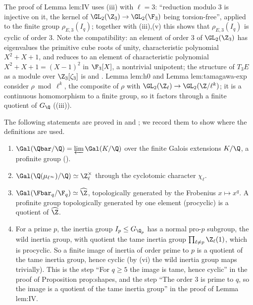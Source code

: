 \begin{paperlink}
The proof of Lemma lem:IV uses (iii) with $\ell=3$: ``reduction modulo $3$ is injective on it, the kernel of $\GL_2(\Z_3)\to\GL_2(\F_3)$ being
torsion-free'', applied to the finite group $\rho_{E,3}(I_q)$; together with (iii),(v) this shows that $\rho_{E,3}(I_q)$ is cyclic of order $3$.
Note the compatibility: an element of order $3$ of $\GL_2(\Z_3)$ has eigenvalues the primitive cube roots of unity, characteristic polynomial $X^2+X+1$, and reduces to
an element of characteristic polynomial $X^2+X+1=(X-1)^2$ in $\F_3[X]$, a nontrivial unipotent; the structure of $T_3E$ as a module over $\Z_3[\zeta_3]$ is
 and . Lemma lem:h0 and Lemma lem:tamagawa-exp consider $\rho\bmod\ell^k$, the composite of $\rho$ with $\GL_2(\Z_\ell)\to\GL_2(\Z/\ell^k)$; it is
a continuous homomorphism to a finite group, so it factors through a finite quotient of $G_\Q$ ((iii)).
\end{paperlink}

\begin{example}\label{ex:groups:galoisprofinite}
The following statements are proved in  and ; we record them to show where the definitions are used.
\begin{enumerate}[label=(\alph*)]
\item $\Gal(\Qbar/\Q)=\varprojlim\Gal(K/\Q)$ over the finite Galois extensions $K/\Q$, a profinite group ().
\item $\Gal(\Q(\mu_{\ell^\infty})/\Q)\simeq\Z_\ell^\times$ through the cyclotomic character $\chi_\ell$.
\item $\Gal(\Fbar_q/\F_q)\simeq\widehat\Z$, topologically generated by the Frobenius $x\mapsto x^q$. A profinite group topologically generated by one element (procyclic) is a
quotient of $\widehat\Z$.
\item For a prime $p$, the inertia group $I_p\le G_{\Q_p}$ has a normal pro-$p$ subgroup, the wild inertia group, with quotient the tame inertia group
$\prod_{\ell\ne p}\Z_\ell(1)$, which is procyclic. So a finite image of inertia of order prime to $p$ is a quotient of the tame inertia group, hence cyclic (by
(vi) the wild inertia group maps trivially). This is the step ``For $q\ge5$ the image is tame, hence cyclic'' in the proof of Proposition prop:shapes, and the step ``The order $3$ is
prime to $q$, so the image is a quotient of the tame inertia group'' in the proof of Lemma lem:IV.
\end{enumerate}
\end{example}

